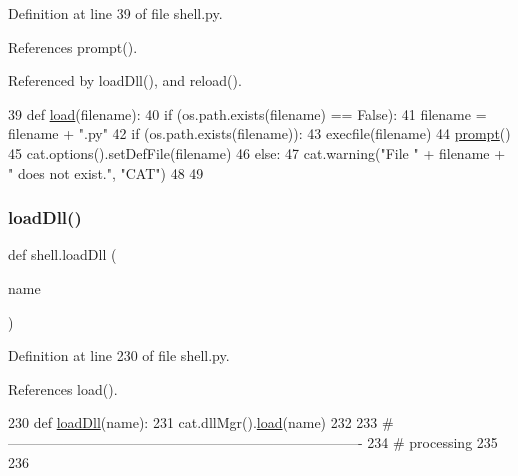 Definition at line 39 of file shell.\+py.



References prompt().



Referenced by load\+Dll(), and reload().


\begin{DoxyCode}
39 \textcolor{keyword}{def }\hyperlink{namespaceshell_af9ea9dab4000d08fadcd5fed31b64911}{load}(filename):
40   \textcolor{keywordflow}{if} (os.path.exists(filename) == \textcolor{keyword}{False}):
41     filename = filename + \textcolor{stringliteral}{".py"}
42   \textcolor{keywordflow}{if} (os.path.exists(filename)):
43     execfile(filename)
44     \hyperlink{namespaceshell_af141a2fee68e5e84d8ac2cc51c3feedd}{prompt}()
45     cat.options().setDefFile(filename)
46   \textcolor{keywordflow}{else}:
47     cat.warning(\textcolor{stringliteral}{"File "} + filename + \textcolor{stringliteral}{" does not exist."}, \textcolor{stringliteral}{"CAT"})
48 
49 
\end{DoxyCode}
\mbox{\label{namespaceshell_a8bb3d636e52da2226367b0123101a49f}} 
\subsubsection{\texorpdfstring{load\+Dll()}{loadDll()}}
{\footnotesize\ttfamily def shell.\+load\+Dll (\begin{DoxyParamCaption}\item[{}]{name }\end{DoxyParamCaption})}



Definition at line 230 of file shell.\+py.



References load().


\begin{DoxyCode}
230 \textcolor{keyword}{def }\hyperlink{namespaceshell_a8bb3d636e52da2226367b0123101a49f}{loadDll}(name):
231   cat.dllMgr().\hyperlink{namespaceshell_af9ea9dab4000d08fadcd5fed31b64911}{load}(name)
232 
233 \textcolor{comment}{#----------------------------------------------------------------------------}
234 \textcolor{comment}{# processing}
235 
236 
\end{DoxyCode}
\mbox{\label{namespaceshell_aa9b05ca51c55671aa9ce6973d3c68049}} 
